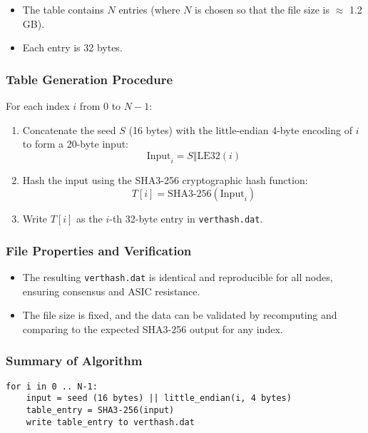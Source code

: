 \documentclass[12pt]{article}
\begin{document}
\begin{itemize}
    \item The table contains $N$ entries (where $N$ is chosen so that the file size is $\approx$ 1.2\,GB).
    \item Each entry is 32 bytes.
\end{itemize}

\subsubsection{Table Generation Procedure}

For each index $i$ from $0$ to $N-1$:

\begin{enumerate}
    \item Concatenate the seed $S$ (16 bytes) with the little-endian 4-byte encoding of $i$ to form a 20-byte input:
    \[
    \text{Input}_i = S \Vert \mathrm{LE32}(i)
    \]
    \item Hash the input using the SHA3-256 cryptographic hash function:
    \[
    T[i] = \mathrm{SHA3}\text{-}256(\text{Input}_i)
    \]
    \item Write $T[i]$ as the $i$-th 32-byte entry in \texttt{verthash.dat}.
\end{enumerate}

\subsubsection{File Properties and Verification}

\begin{itemize}
    \item The resulting \texttt{verthash.dat} is identical and reproducible for all nodes, ensuring consensus and ASIC resistance.
    \item The file size is fixed, and the data can be validated by recomputing and comparing to the expected SHA3-256 output for any index.
\end{itemize}

\subsubsection{Summary of Algorithm}

\begin{verbatim}
for i in 0 .. N-1:
    input = seed (16 bytes) || little_endian(i, 4 bytes)
    table_entry = SHA3-256(input)
    write table_entry to verthash.dat
\end{verbatim}
\end{document}
